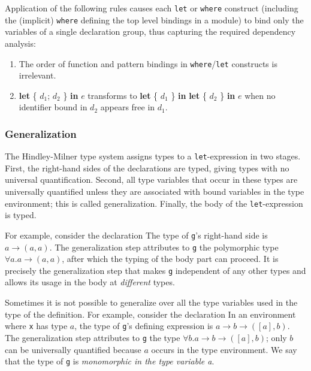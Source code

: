 Application of the following rules causes each \texttt{let} or \texttt{where} construct (including the (implicit) \texttt{where} defining the top level bindings in a module) to bind only the variables of a single declaration group, thus capturing the required dependency analysis:

\begin{enumerate}
\item The order of function and pattern bindings in \texttt{where}/\texttt{let} constructs is irrelevant.
\item \textbf{let} \{ $d_1$; $d_2$ \} \textbf{in} $e$ transforms to \textbf{let} \{ $d_1$  \} \textbf{in} \textbf{let} \{ $d_2$ \} \textbf{in} $e$ when no identifier bound in $d_2$ appears free in $d_1$.
\end{enumerate}

\subsubsection{Generalization} \label{generalization}

The Hindley-Milner type system assigns types to a \texttt{let}-expression in two stages.
First, the right-hand sides of the declarations are typed, giving types with no universal quantification.
Second, all type variables that occur in these types are universally quantified unless they are associated with bound variables in the type environment; this is called generalization.
Finally, the body of the \texttt{let}-expression is typed.

For example, consider the declaration 
The type of \texttt{g}'s right-hand side is $a \rightarrow{} (a,a)$. The generalization step attributes to \texttt{g} the polymorphic type $\forall a. a \rightarrow{} (a,a)$, after which the typing of the body part can proceed. It is precisely the generalization step that makes \texttt{g} independent of any other types and allows its usage in the body at \emph{different} types.

Sometimes it is not possible to generalize over all the type variables used in the type of the definition. For example, consider the declaration  
In an environment where \texttt{x} has type $a$, the type of \texttt{g}'s defining expression is $a \rightarrow{} b \rightarrow{} ([a],b)$. The generalization step attributes to \texttt{g} the type $\forall{} b$.$a \rightarrow{} b \rightarrow{} ([a],b)$; only $b$ can be universally quantified because $a$ occurs in the type environment. We say that the type of \texttt{g} is \emph{monomorphic in the type variable a}.

